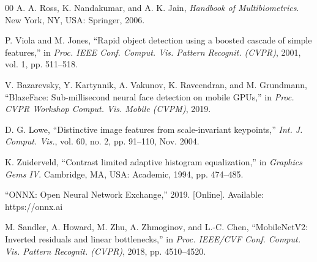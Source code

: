 \documentclass[conference]{IEEEtran}
\begin{document}
\begin{thebibliography}{00}
 A. A. Ross, K. Nandakumar, and A. K. Jain, \textit{Handbook of Multibiometrics}. New York, NY, USA: Springer, 2006.

 P. Viola and M. Jones, ``Rapid object detection using a boosted cascade of simple features,'' in \textit{Proc. IEEE Conf. Comput. Vis. Pattern Recognit. (CVPR)}, 2001, vol. 1, pp. 511--518.

 V. Bazarevsky, Y. Kartynnik, A. Vakunov, K. Raveendran, and M. Grundmann, ``BlazeFace: Sub-millisecond neural face detection on mobile GPUs,'' in \textit{Proc. CVPR Workshop Comput. Vis. Mobile (CVPM)}, 2019.

 D. G. Lowe, ``Distinctive image features from scale-invariant keypoints,'' \textit{Int. J. Comput. Vis.}, vol. 60, no. 2, pp. 91--110, Nov. 2004.

 K. Zuiderveld, ``Contrast limited adaptive histogram equalization,'' in \textit{Graphics Gems IV}. Cambridge, MA, USA: Academic, 1994, pp. 474--485.

 ``ONNX: Open Neural Network Exchange,'' 2019. [Online]. Available: https://onnx.ai

 M. Sandler, A. Howard, M. Zhu, A. Zhmoginov, and L.-C. Chen, ``MobileNetV2: Inverted residuals and linear bottlenecks,'' in \textit{Proc. IEEE/CVF Conf. Comput. Vis. Pattern Recognit. (CVPR)}, 2018, pp. 4510--4520.

\end{thebibliography}
\end{document}
